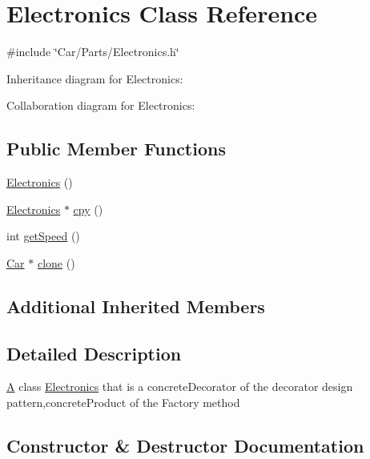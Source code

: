 \hypertarget{classElectronics}{}\section{Electronics Class Reference}
\label{classElectronics}


{\ttfamily \#include \char`\"{}Car/\+Parts/\+Electronics.\+h\char`\"{}}



Inheritance diagram for Electronics\+:


Collaboration diagram for Electronics\+:
\subsection*{Public Member Functions}
\begin{DoxyCompactItemize}
\item 
\hyperlink{classElectronics_a71e4503837d87a340c2d1e8288a1c6c1}{Electronics} ()
\item 
\hyperlink{classElectronics}{Electronics} $\ast$ \hyperlink{classElectronics_a156b51c0a1a7f2850e33dbc6879b9c1e}{cpy} ()
\item 
int \hyperlink{classElectronics_a09912c940a0a8656d97f8597b766c0eb}{get\+Speed} ()
\item 
\hyperlink{classCar}{Car} $\ast$ \hyperlink{classElectronics_a292164aedff12771f4f05af648a9fc70}{clone} ()
\end{DoxyCompactItemize}
\subsection*{Additional Inherited Members}


\subsection{Detailed Description}
\hyperlink{classA}{A} class \hyperlink{classElectronics}{Electronics} that is a concrete\+Decorator of the decorator design pattern,concrete\+Product of the Factory method 

\subsection{Constructor \& Destructor Documentation}
\mbox{\label{classElectronics_a71e4503837d87a340c2d1e8288a1c6c1}} 

